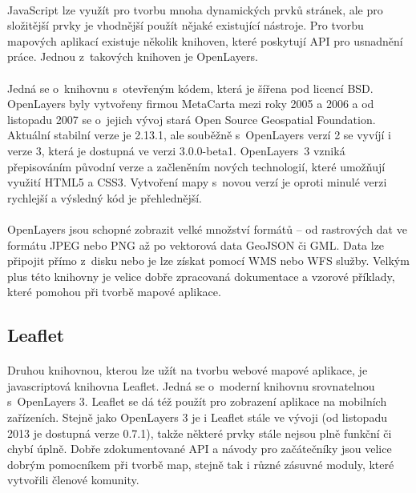 \documentclass[11pt,a4paper,titlepage,oneside]{book}
\begin{document}
			\paragraph{} JavaScript lze využít pro tvorbu mnoha dynamických prvků stránek, ale pro složitější prvky je vhodnější použít nějaké existující nástroje. Pro tvorbu mapových aplikací existuje několik knihoven, které poskytují  API  pro usnad\-nění práce. Jednou z~takových knihoven je OpenLayers.
			\paragraph{} Jedná se o~knihovnu s~otevřeným kódem, která je šířena pod licencí BSD. OpenLayers byly vytvořeny firmou MetaCarta mezi roky 2005 a 2006 a od listopadu 2007 se o~jejich vývoj stará Open Source Geospatial Foundation\cite{wiki_ol}. Aktuální stabilní verze je 2.13.1, ale souběžně s~OpenLayers verzí 2 se vyvíjí i verze 3, která je dostupná ve verzi 3.0.0-beta1. OpenLayers~3 vzniká přepisováním původní verze a začleněním nových technologií, které umožňují využití HTML5 a CSS3\cite{ol}. Vytvoření mapy s~novou verzí je oproti minulé verzi rychlejší a výsledný kód je přehlednější.
			\paragraph{}OpenLayers jsou schopné zobrazit velké množství formátů -- od rastrových dat ve formátu JPEG nebo PNG až po vektorová data GeoJSON či GML. Data lze připojit přímo z~disku nebo je lze získat pomocí WMS nebo WFS služby. Velkým plus této knihovny je velice dobře zpracovaná dokumentace a vzorové příklady, které pomohou při tvorbě mapové aplikace. 
		\subsection{Leaflet}
			\paragraph{} Druhou knihovnou, kterou lze užít na tvorbu webové mapové aplikace, je javascriptová knihovna Leaflet. Jedná se o~moderní knihovnu srovnatelnou s~OpenLayers 3. Leaflet se dá též použít pro zobrazení aplikace na mobilních zařízeních. Stejně jako OpenLayers 3 je i Leaflet stále ve vývoji (od listopadu 2013 je dostupná verze 0.7.1)\cite{Leaflet}, takže některé prvky stále nejsou plně funkční či chybí úplně. Dobře zdokumentované API a návody pro začátečníky jsou velice dobrým pomocníkem při tvorbě map, stejně tak i různé zásuvné moduly, které vytvořili členové komunity.
\end{document}
